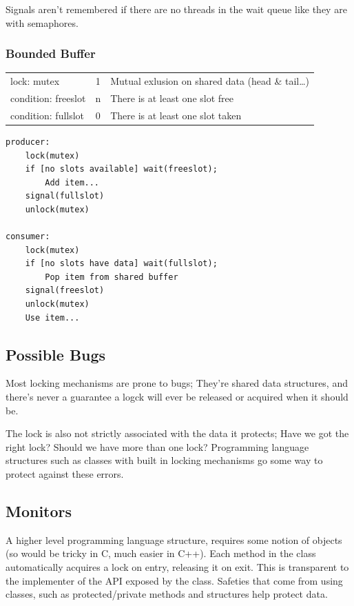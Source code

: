\documentclass[a4]{article}
\begin{document}
Signals aren't remembered if there are no threads in the wait queue like they are with semaphores.

\subsubsection{Bounded Buffer}


\begin{tabular}{l | c | l }
lock:      mutex    & 1 & Mutual exlusion on shared data (head \& tail\ldots{})\\
condition: freeslot & n & There is at least one slot free\\
condition: fullslot & 0 & There is at least one slot taken
\end{tabular}

\begin{verbatim}
producer:
    lock(mutex)
    if [no slots available] wait(freeslot);
        Add item...
    signal(fullslot)
    unlock(mutex)

consumer:
    lock(mutex)
    if [no slots have data] wait(fullslot);
        Pop item from shared buffer
    signal(freeslot)
    unlock(mutex)
    Use item...
\end{verbatim}

\subsection{Possible Bugs}

Most locking mechanisms are prone to bugs; They're shared data structures, and there's never a
guarantee a logck will ever be released or acquired when it should be.

The lock is also not strictly associated with the data it protects; Have we got the right lock? 
Should we have more than one lock? Programming language structures
such as classes with built in locking mechanisms go some way to protect against these errors.


\subsection{Monitors}

A higher level programming language structure, requires some notion of objects (so would be tricky 
in C, much easier in C++). Each method in the class automatically acquires a lock on entry, 
releasing it on exit. This is transparent to the implementer of the API exposed by the class. 
Safeties that come from using classes, such as protected/private methods and structures help protect data.
\end{document}
